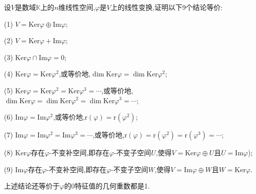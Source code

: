 \documentclass[../../main.tex]{subfiles}%
\begin{document}
\begin{proposition}[经典结论]\label{proposition:像空间和核空间的直和分解}
设\(V\)是数域\(\mathbb{K}\)上的\(n\)维线性空间,\(\varphi\)是\(V\)上的线性变换,证明以下9个结论等价:

(1) \(V=\text{Ker}\varphi\oplus\text{Im}\varphi\);

(2) \(V=\text{Ker}\varphi+\text{Im}\varphi\);

(3) \(\text{Ker}\varphi\cap\text{Im}\varphi = 0\);

(4) \(\text{Ker}\varphi=\text{Ker}\varphi^2\),或等价地,\(\dim\text{Ker}\varphi=\dim\text{Ker}\varphi^2\);

(5) \(\text{Ker}\varphi=\text{Ker}\varphi^2=\text{Ker}\varphi^3=\cdots\),或等价地,\(\dim\text{Ker}\varphi=\dim\text{Ker}\varphi^2=\dim\text{Ker}\varphi^3=\cdots\);

(6) \(\text{Im}\varphi=\text{Im}\varphi^2\),或等价地,\(\text{r}(\varphi)=\text{r}(\varphi^2)\);

(7) \(\text{Im}\varphi=\text{Im}\varphi^2=\text{Im}\varphi^3=\cdots\),或等价地,\(\text{r}(\varphi)=\text{r}(\varphi^2)=\text{r}(\varphi^3)=\cdots\);

(8) \(\text{Ker}\varphi\)存在\(\varphi\)-不变补空间,即存在\(\varphi\)-不变子空间\(U\),使得\(V=\text{Ker}\varphi\oplus U\)且$U = \text{Im}\varphi$);

(9) \(\text{Im}\varphi\)存在\(\varphi\)-不变补空间,即存在\(\varphi\)-不变子空间\(W\),使得\(V=\text{Im}\varphi\oplus W\)且$W = \text{Ker}\varphi$.
\end{proposition}
\begin{note}
上述结论还等价于$\varphi$的0特征值的几何重数都是1.
\end{note}
\end{document}
